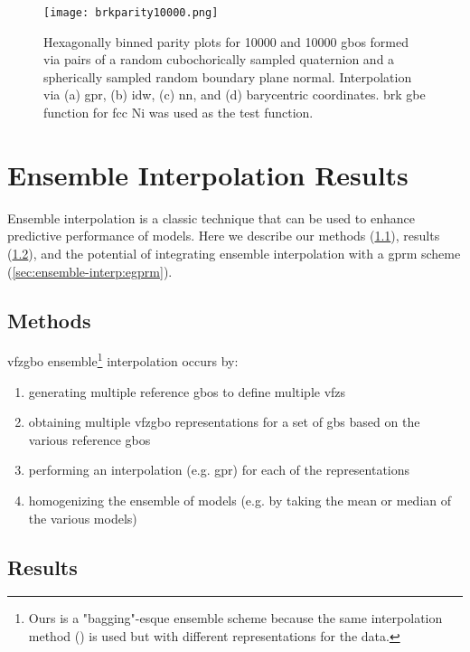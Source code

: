 \documentclass[preprint,12pt]{elsarticle}
\begin{document}
	\begin{figure}[!ht]
		\centering
		\texttt{[image: brkparity10000.png]}
		\caption{Hexagonally binned parity plots for \num{10000} \inpt{} and \num{10000} \outpt{} \glspl{gbo} formed via pairs of a random cubochorically sampled quaternion and a spherically sampled random boundary plane normal. Interpolation via (a) \gls{gpr}, (b) \gls{idw}, (c) \gls{nn}, and (d) barycentric coordinates.  \gls{brk} \gls{gbe} function for \gls{fcc} Ni \cite{bulatovGrainBoundaryEnergy2014} was used as the test function.}
		\label{fig:brkparity10000}
	\end{figure}
	
	\section{Ensemble Interpolation Results}
	\label{sec:ensemble-interp}
	Ensemble interpolation is a classic technique that can be used to enhance predictive performance of models. Here we describe our methods (\cref{sec:ensemble-interp:methods}), results (\cref{sec:ensemble-interp:results}), and the potential of integrating ensemble interpolation with a \gls{gprm} scheme (\cref{sec:ensemble-interp:egprm}).
	
	\subsection{Methods}
	\label{sec:ensemble-interp:methods}
	\Gls{vfzgbo} ensemble\footnote{Ours is a "bagging"-esque ensemble scheme because the same interpolation method () is used but with different representations for the \inpt{} data. } interpolation occurs by:
	\begin{enumerate}
		\item generating multiple reference \glspl{gbo} to define multiple \glspl{vfz}
		\item obtaining multiple \gls{vfzgbo} representations for a set of \glspl{gb} based on the various reference \glspl{gbo}
		\item performing an interpolation (e.g. \gls{gpr}) for each of the representations
		\item homogenizing the ensemble of models (e.g. by taking the mean or median of the various models)
	\end{enumerate}
	
	\subsection{Results}
	\label{sec:ensemble-interp:results}
	
\end{document}
